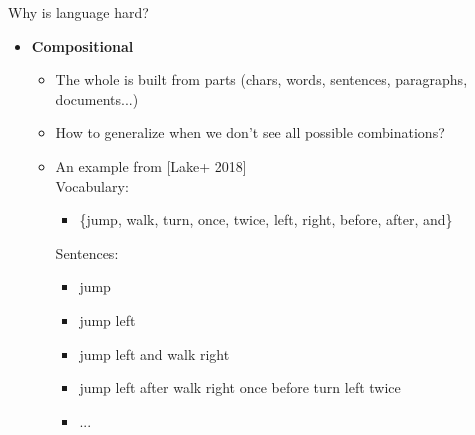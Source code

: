\documentclass[usenames,dvipsnames,notes,11pt,aspectratio=169]{beamer}
\begin{document}
\begin{frame}
    {Why is language hard?}
    \begin{itemize}
        \item \textbf{Compositional}
            \begin{itemize}
                \item The whole is built from parts (chars, words, sentences, paragraphs, documents...)
                \item How to generalize when we don't see all possible combinations?\\
                \item An example from [Lake+ 2018]\\
                Vocabulary:\\
                    \begin{itemize}
                    \item[]\{jump, walk, turn, once, twice, left, right, before, after, and\}
                    \end{itemize}
                Sentences: \\
                    \begin{itemize}
                       \item[]jump \\
                       \item[]jump left\\
                       \item[]jump left and walk right \\
                       \item[]jump left after walk right once before turn left twice\\
                       \item[]...
                    \end{itemize}
            \end{itemize}
    \end{itemize}
\end{frame}
\end{document}
